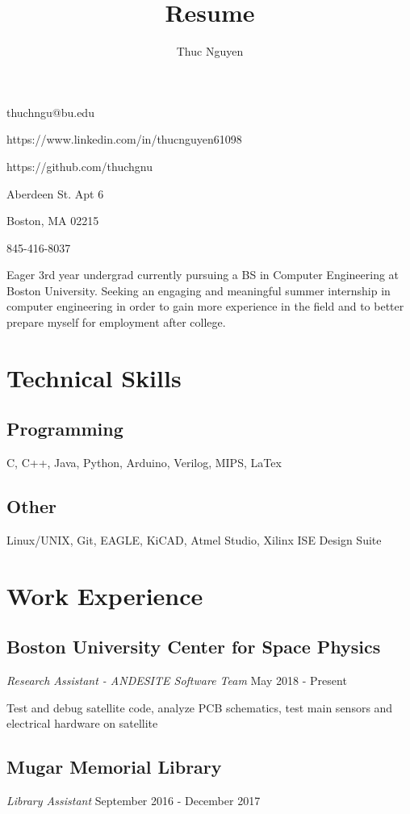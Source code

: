 \documentclass{article}
\makeatletter
\renewcommand{\maketitle}
{\begin{center}
{\huge\bfseries\theauthor}
\vspace{.5em}

thuchngu@bu.edu

https://www.linkedin.com/in/thucnguyen61098

https://github.com/thuchgnu

\end{center}}
\makeatother
\begin{document}
\title{Resume}
\author{Thuc Nguyen}
\maketitle
\vspace{-.5em}
{ Aberdeen St. Apt 6

Boston, MA 02215

845-416-8037

}

\vspace{.5em}

Eager 3rd year undergrad currently pursuing a BS in Computer Engineering at Boston University. Seeking an engaging and meaningful summer internship in computer engineering in order to gain more experience in the field and to better prepare myself for employment after college.





\section{Technical Skills}
\subsection{Programming}
C, C++, Java, Python, Arduino, Verilog, MIPS, LaTex
\subsection{Other}
Linux/UNIX, Git, EAGLE, KiCAD, Atmel Studio, Xilinx ISE Design Suite

\section{Work Experience}
\subsection{Boston University Center for Space Physics}  \textit{Research Assistant - ANDESITE Software Team}
May 2018 - Present

Test and debug satellite code, analyze PCB schematics, test main sensors and electrical hardware on satellite
\subsection{Mugar Memorial Library} \textit{Library Assistant}
September 2016 - December 2017
\end{document}
